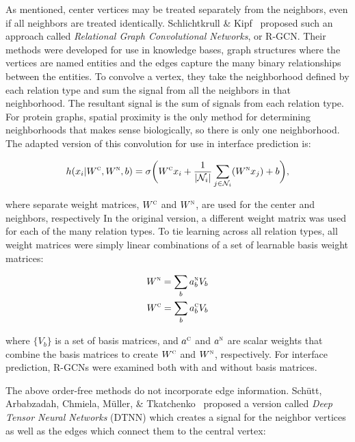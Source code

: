 As mentioned, center vertices may be treated separately from the neighbors, even if all neighbors are treated identically. 
Schlichtkrull \& Kipf~\cite{schlichtkrull2017} proposed such an approach called \emph{Relational Graph Convolutional Networks}, or R-GCN.
Their methods were developed for use in knowledge bases, graph structures where the vertices are named entities and the edges capture the many binary relationships between the entities. 
To convolve a vertex, they take the neighborhood defined by each relation type and sum the signal from all the neighbors in that neighborhood.
The resultant signal is the sum of signals from each relation type.
For protein graphs, spatial proximity is the only method for determining neighborhoods that makes sense biologically, so there is only one neighborhood.
The adapted version of this convolution for use in interface prediction is:

\begin{equation}
h(x_i | W^\textsc{c}, W^\textsc{n}, b)= \sigma \bigg( W^\textsc{c} x_i + \frac{1}{|\mathcal{N}_i|} \sum_{j \in \mathcal{N}_i}(W^\textsc{n} x_j)  + b\bigg),
\label{eq:rgcn}
\end{equation}

\noindent
where separate weight matrices, $W^\textsc{c}$ and $W^\textsc{n}$, are used for the center and neighbors, respectively
In the original version, a different weight matrix was used for each of the many relation types.  
To tie learning across all relation types, all weight matrices were simply linear combinations of a set of learnable basis weight matrices:

\begin{equation}
\begin{split}
W^\textsc{n} = \sum_{b} a^\textsc{n}_b V_b \\
W^\textsc{c} = \sum_{b} a^\textsc{c}_b V_b 
\end{split}
\label{eq:rgcn_basis}
\end{equation}

\noindent
where $\{V_b\}$ is a set of basis matrices, and $a^\textsc{c}$ and $a^\textsc{n}$ are scalar weights that combine the basis matrices to create $W^\textsc{c}$ and $W^\textsc{n}$, respectively.
For interface prediction, R-GCNs were examined both with and without basis matrices.

The above order-free methods do not incorporate edge information.
Sch{\"u}tt, Arbabzadah, Chmiela, M{\"u}ller, \& Tkatchenko~\cite{schutt2017} proposed a version called \emph{Deep Tensor Neural Networks} (DTNN) which creates a signal for the neighbor vertices as well as the edges which connect them to the central vertex:

